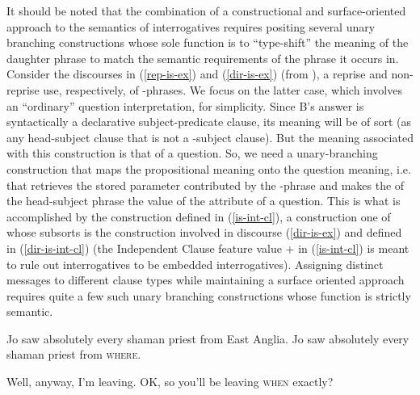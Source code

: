 \documentclass[output=paper]{langsci/langscibook}
\begin{document}
It should be noted that the combination of a constructional and surface-oriented approach to the semantics of interrogatives requires positing several unary branching constructions whose sole function is to ``type-shift'' the meaning of the daughter phrase to match the semantic requirements of the phrase it occurs in. Consider the discourses in (\ref{rep-is-ex}) and (\ref{dir-is-ex}) (from \citealt[p.270,ex.37 and 63a]{GinzburgandSag2001}), a reprise and non-reprise use, respectively, of  -phrases. We focus on the latter case, which involves an ``ordinary'' question interpretation, for simplicity. Since B's answer is syntactically a declarative subject-predicate clause, its meaning will be of sort  (as any head-subject clause that is not a -subject clause). But the meaning associated with this construction is that of a question. So, we need a unary-branching construction that maps the propositional meaning onto the question meaning, i.e. that retrieves the stored parameter contributed by the -phrase and makes the  of the head-subject phrase the value of the  attribute of a question. This is what is accomplished by the  construction defined in (\ref{is-int-cl}), a construction one of whose subsorts is the construction involved in discourse (\ref{dir-is-ex}) and defined in (\ref{dir-is-int-cl}) (the Independent Clause feature value $+$ in (\ref{is-int-cl}) is meant to rule out 
 interrogatives to be embedded interrogatives). Assigning distinct messages to different clause types while maintaining a surface oriented approach requires quite a few such unary branching constructions whose function is strictly semantic.

\begin{exe}
\ex\label{rep-is-ex}
\begin{xlist}
Jo saw absolutely every shaman priest from East Anglia.
 Jo saw absolutely every shaman priest from \textsc{where}.
\end{xlist}
\ex\label{dir-is-ex}
\begin{xlist}
 Well, anyway, I'm leaving.
 OK, so you'll be leaving \textsc{when} exactly?
\end{xlist}
\end{exe}
\end{document}
